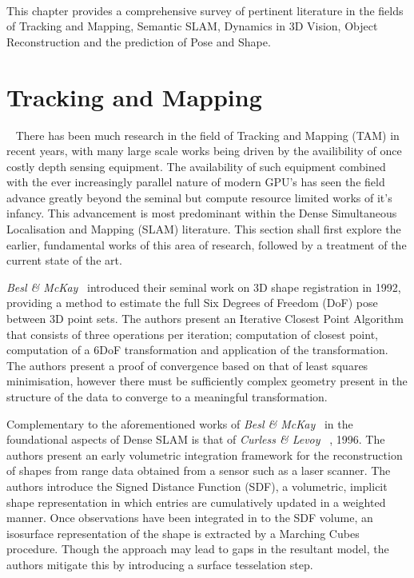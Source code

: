 ~\label{chap:lit_review}
\begin{chapterabstract}
This chapter provides a comprehensive survey of pertinent literature in the fields 
of Tracking and Mapping, Semantic SLAM, Dynamics in 3D Vision, Object Reconstruction 
and the prediction of Pose and Shape.
\end{chapterabstract}

\section{Tracking and Mapping}
~\label{sec:lit_review_tam}
There has been much research in the field of Tracking and Mapping (TAM) in recent 
years, with many large scale works being driven by the availibility of once 
costly depth sensing equipment. The availability of such equipment combined 
with the ever increasingly parallel nature of modern GPU's has seen the 
field advance greatly beyond the seminal but compute resource limited works of it's 
infancy. This advancement is most predominant within the Dense Simultaneous 
Localisation and Mapping (SLAM) literature. This section shall first explore the 
earlier, fundamental works of this area of research, followed by a treatment 
of the current state of the art.

\textit{Besl \& McKay}~\cite{Besl1992} introduced their seminal work on 3D shape 
registration in 1992, providing a method to estimate the full Six Degrees of 
Freedom (DoF) pose between 3D point sets. The authors present an Iterative Closest 
Point Algorithm that consists of three operations per iteration; computation 
of closest point, computation of a 6DoF transformation and application of 
the transformation. The authors present a proof of convergence based on that 
of least squares minimisation, however there must be sufficiently complex 
geometry present in the structure of the data to converge to a meaningful 
transformation.

Complementary to the aforementioned works of \textit{Besl \& McKay}~\cite{Besl1992} 
in the foundational aspects of Dense SLAM is that of \textit{Curless \& Levoy} 
~\cite{Curless1996}, 1996. The authors present an early volumetric integration 
framework for the reconstruction of shapes from range data obtained from a 
sensor such as a laser scanner. The authors introduce the Signed Distance Function (SDF), 
a volumetric, implicit shape representation in which entries are cumulatively updated 
in a weighted manner. Once observations have been integrated in to the SDF volume, an 
isosurface representation of the shape is extracted by a Marching Cubes~\cite{Lorensen1987} 
procedure. Though the approach may lead to gaps in the resultant model, the authors 
mitigate this by introducing a surface tesselation step.

